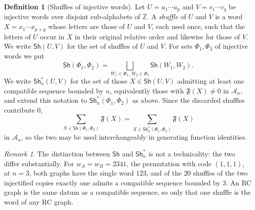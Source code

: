 \documentclass{amsart}
\theoremstyle{definition}
\newtheorem{definition}[lemma]{Definition}
\theoremstyle{remark}
\newtheorem*{remark}{Remark}
\numberwithin{equation}{subsection}
\newcommand{\wof}[1]{w_{#1}}
\newcommand{\coma}{\mathcal{A}}
\begin{document}
\begin{definition}[Shuffles of injective words]\label{definition:shuffle}
Let $U=u_1\cdots u_p$ and $V=v_1\cdots v_q$ be injective words over disjoint sub-alphabets of $\overline{\mathbb{Z}}$. A \emph{shuffle} of $U$ and $V$ is a word $X=x_1\cdots x_{p+q}$ whose letters are those of $U$ and $V$, each used once, such that the letters of $U$ occur in $X$ in their original relative order and likewise for those of $V$. We write $\mathsf{Sh}(U,V)$ for the set of shuffles of $U$ and $V$. For sets $\Phi_1,\Phi_2$ of injective words we put
$$\mathsf{Sh}(\Phi_1,\Phi_2)=\bigsqcup_{W_1\in\Phi_1,\,W_2\in\Phi_2}\mathsf{Sh}(W_1,W_2).$$
We write $\mathsf{Sh}^{*}_n(U,V)$ for the set of those $X\in\mathsf{Sh}(U,V)$ admitting at least one compatible sequence bounded by $n$, equivalently those with $\mathfrak{F}(X)\neq 0$ in $\coma_n$, and extend this notation to $\mathsf{Sh}^{*}_n(\Phi_1,\Phi_2)$ as above. Since the discarded shuffles contribute $0$,
$$\sum_{X\in\mathsf{Sh}(\Phi_1,\Phi_2)}\mathfrak{F}(X)=\sum_{X\in\mathsf{Sh}^{*}_n(\Phi_1,\Phi_2)}\mathfrak{F}(X)$$
in $\coma_n$, so the two may be used interchangeably in generating function identities.
\end{definition}

\begin{remark}
The distinction between $\mathsf{Sh}$ and $\mathsf{Sh}^{*}_n$ is not a technicality: the two differ substantially. For $\wof A=\wof B=2341$, the permutation with code $(1,1,1)$, at $n=3$, both graphs have the single word $123$, and of the $20$ shuffles of the two injectified copies exactly one admits a compatible sequence bounded by $3$. An RC graph is the same datum as a compatible sequence, so only that one shuffle is the word of any RC graph.
\end{remark}
\end{document}
